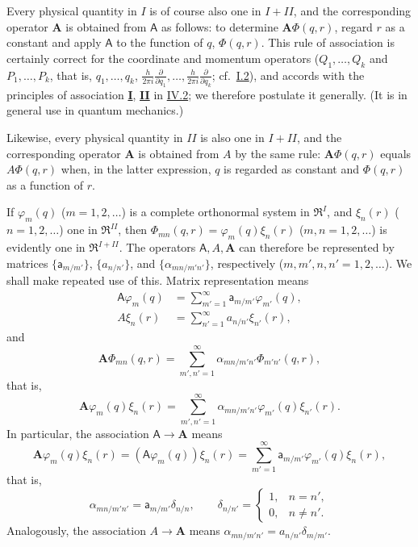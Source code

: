 \documentclass[fontsize=13pt,twoside,openany,headings=normal,parskip=false,bookmarkpackage=false,DIV=calc]{scrbook}
\begin{document}
Every physical quantity in $I$ is of course also one in $I+II$, and the corresponding operator $\boldsymbol A$ is obtained from $\mathsf A$ as follows: to determine $\boldsymbol A\Phi(q,r)$, regard $r$ as a constant and apply $\mathsf A$ to the function of $q$, $\Phi(q,r)$. This rule of association is certainly correct for the coordinate and momentum operators ($Q_1,\ldots,Q_k$ and $P_1,\ldots,P_k$, that is, $q_1,\ldots,q_k$, $\frac{h}{2\pi i}\frac{\partial}{\partial q_1},\ldots,\frac{h}{2\pi i}\frac{\partial}{\partial q_k}$; cf.\ \hyperref[sec:I.2]{I.2}), and accords with the principles of association \hyperref[cond:IV.2.I]{\textbf{I}}, \hyperref[cond:IV.2.II]{\textbf{II}} in \hyperref[sec:IV.2]{IV.2}; we therefore postulate it generally. (It is in general use in quantum mechanics.)

Likewise, every physical quantity in $II$ is also one in $I+II$, and the corresponding operator $\boldsymbol A$ is obtained from $A$ by the same rule: $\boldsymbol A\Phi(q,r)$ equals $A\Phi(q,r)$ when, in the latter expression, $q$ is regarded as constant and $\Phi(q,r)$ as a function of $r$.

If $\varphi_m(q)$ ($m=1,2,\ldots$) is a complete orthonormal system in $\mathfrak R^I$, and $\xi_n(r)$ ($n=1,2,\ldots$) one in $\mathfrak R^{II}$, then $\Phi_{mn}(q,r)=\varphi_m(q)\xi_n(r)$ ($m,n=1,2,\ldots$) is evidently one in $\mathfrak R^{I+II}$. The operators $\mathsf A,A,\boldsymbol A$ can therefore be represented by matrices $\{\mathsf a_{m/m'}\}$, $\{a_{n/n'}\}$, and $\{\alpha_{mn/m'n'}\}$, respectively ($m,m',n,n'=1,2,\ldots$). We shall make repeated use of this. Matrix representation means
\begin{align*}
 \mathsf A\varphi_m(q)&=\sum_{m'=1}^{\infty}\mathsf a_{m/m'}\varphi_{m'}(q),\\
 A\xi_n(r)&=\sum_{n'=1}^{\infty}a_{n/n'}\xi_{n'}(r),
\end{align*}
\hypertarget{origpage-226}{}%
and
\[
 \boldsymbol A\Phi_{mn}(q,r)
 =\sum_{m',n'=1}^{\infty}\alpha_{mn/m'n'}\Phi_{m'n'}(q,r),
\]
that is,
\[
 \boldsymbol A\varphi_m(q)\xi_n(r)
 =\sum_{m',n'=1}^{\infty}\alpha_{mn/m'n'}\varphi_{m'}(q)\xi_{n'}(r).
\]
In particular, the association $\mathsf A\longrightarrow\boldsymbol A$ means
\[
 \boldsymbol A\varphi_m(q)\xi_n(r)
 =(\mathsf A\varphi_m(q))\xi_n(r)
 =\sum_{m'=1}^{\infty}\mathsf a_{m/m'}\varphi_{m'}(q)\xi_n(r),
\]
that is,
\[
 \alpha_{mn/m'n'}=\mathsf a_{m/m'}\delta_{n/n},\qquad
 \delta_{n/n'}=\begin{cases}1,&n=n',\\0,&n\ne n'.\end{cases}
\]
 Analogously, the association $A\longrightarrow\boldsymbol A$ means $\alpha_{mn/m'n'}=a_{n/n'}\delta_{m/m'}$.
\end{document}
